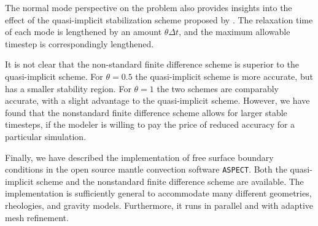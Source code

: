 \documentclass[preprint,12pt,authoryear]{elsarticle}
\begin{document}
The normal mode perspective on the problem also provides insights into the effect of 
the quasi-implicit stabilization scheme proposed by \citet{kaus2010stabilization}.
The relaxation time of each mode is lengthened by an amount $\theta \Delta t$, and the
maximum allowable timestep is correspondingly lengthened.

It is not clear that the non-standard finite difference scheme is superior to 
the quasi-implicit scheme. For $\theta=0.5$ the quasi-implicit scheme is more accurate,
but has a smaller stability region. For $\theta=1$ the two schemes are comparably accurate,
with a slight advantage to the quasi-implicit scheme. However, we have found that
the nonstandard finite difference scheme allows for larger stable timesteps, if the modeler 
is willing to pay the price of reduced accuracy for a particular simulation.

Finally, we have described the implementation of free surface boundary conditions in 
the open source mantle convection software \texttt{ASPECT}. Both the quasi-implicit 
scheme and the nonstandard finite difference scheme are available. The implementation is 
sufficiently general to accommodate many different geometries, rheologies, and 
gravity models. Furthermore, it runs in parallel and with adaptive mesh refinement.
\end{document}
